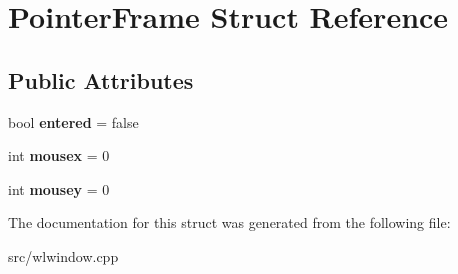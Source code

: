 \hypertarget{structPointerFrame}{}\section{Pointer\+Frame Struct Reference}
\label{structPointerFrame}
\subsection*{Public Attributes}
\begin{DoxyCompactItemize}
\item 
\mbox{\label{structPointerFrame_a664d855ab5a194f63140ce6dd00478a6}} 
bool {\bfseries entered} = false
\item 
\mbox{\label{structPointerFrame_a48affde73c22114a914471a6d88eabcf}} 
int {\bfseries mousex} = 0
\item 
\mbox{\label{structPointerFrame_aa215411c6490f3c0a4d0d8543889cb27}} 
int {\bfseries mousey} = 0
\end{DoxyCompactItemize}


The documentation for this struct was generated from the following file\+:\begin{DoxyCompactItemize}
\item 
src/wlwindow.\+cpp\end{DoxyCompactItemize}
